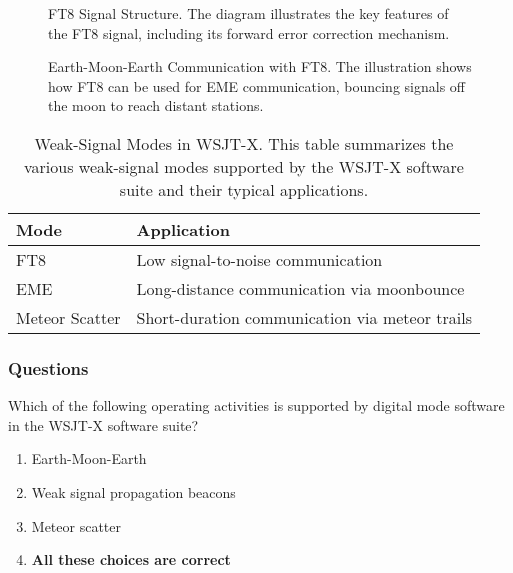 \begin{figure}[h!]
    \centering
    \caption{FT8 Signal Structure. The diagram illustrates the key features of the FT8 signal, including its forward error correction mechanism.}
    \label{fig:ft8-structure}
\end{figure}

\begin{figure}[h!]
    \centering
    \caption{Earth-Moon-Earth Communication with FT8. The illustration shows how FT8 can be used for EME communication, bouncing signals off the moon to reach distant stations.}
    \label{fig:eme-ft8}
\end{figure}

\begin{table}[h!]
    \centering
    \begin{tabular}{|l|l|}
        \hline
        \textbf{Mode} & \textbf{Application} \\
        \hline
        FT8 & Low signal-to-noise communication \\
        EME & Long-distance communication via moonbounce \\
        Meteor Scatter & Short-duration communication via meteor trails \\
        \hline
    \end{tabular}
    \caption{Weak-Signal Modes in WSJT-X. This table summarizes the various weak-signal modes supported by the WSJT-X software suite and their typical applications.}
    \label{tab:wsjt-x-modes}
\end{table}

\subsubsection{Questions}

\begin{tcolorbox}[colback=gray!10!white,colframe=black!75!black,title={T8D10}]
    Which of the following operating activities is supported by digital mode software in the WSJT-X software suite?
    \begin{enumerate}[label=\Alph*),noitemsep]
        \item Earth-Moon-Earth
        \item Weak signal propagation beacons
        \item Meteor scatter
        \item \textbf{All these choices are correct}
    \end{enumerate}
\end{tcolorbox}

